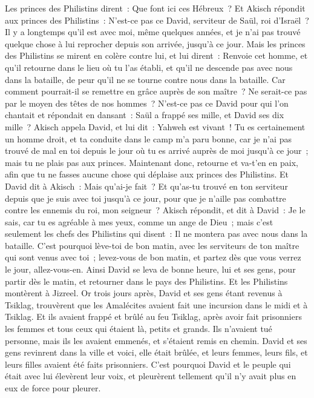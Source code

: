 \begin{multicols}{2}
Les princes des Philistins dirent~: Que font ici ces Hébreux~? Et Akisch répondit aux princes des Philistins~: N'est-ce pas ce David, serviteur de Saül, roi d'Israël~? Il y a longtemps qu'il est avec moi, même quelques années, et je n'ai pas trouvé quelque chose à lui reprocher depuis son arrivée, jusqu'à ce jour.
Mais les princes des Philistins se mirent en colère contre lui, et lui dirent~: Renvoie cet homme, et qu'il retourne dans le lieu où tu l'as établi, et qu'il ne descende pas avec nous dans la bataille, de peur qu'il ne se tourne contre nous dans la bataille. Car comment pourrait-il se remettre en grâce auprès de son maître~? Ne serait-ce pas par le moyen des têtes de nos hommes~?
N'est-ce pas ce David pour qui l'on chantait et répondait en dansant~: Saül a frappé ses mille, et David ses dix mille~?
Akisch appela David, et lui dit~: Yahweh est vivant~! Tu es certainement un homme droit, et ta conduite dans le camp m'a paru bonne, car je n'ai pas trouvé de mal en toi depuis le jour où tu es arrivé auprès de moi jusqu'à ce jour~; mais tu ne plais pas aux princes.
Maintenant donc, retourne et va-t'en en paix, afin que tu ne fasses aucune chose qui déplaise aux princes des Philistins.
Et David dit à Akisch~: Mais qu'ai-je fait~? Et qu'as-tu trouvé en ton serviteur depuis que je suis avec toi jusqu'à ce jour, pour que je n'aille pas combattre contre les ennemis du roi, mon seigneur~?
Akisch répondit, et dit à David~: Je le sais, car tu es agréable à mes yeux, comme un ange de Dieu~; mais c'est seulement les chefs des Philistins qui disent~: Il ne montera pas avec nous dans la bataille.
C'est pourquoi lève-toi de bon matin, avec les serviteurs de ton maître qui sont venus avec toi~; levez-vous de bon matin, et partez dès que vous verrez le jour, allez-vous-en.
Ainsi David se leva de bonne heure, lui et ses gens, pour partir dès le matin, et retourner dans le pays des Philistins. Et les Philistins montèrent à Jizreel.
\VerseOne{}Or trois jours après, David et ses gens étant revenus à Tsiklag, trouvèrent que les Amalécites avaient fait une incursion dans le midi et à Tsiklag. Et ils avaient frappé et brûlé au feu Tsiklag,
après avoir fait prisonniers les femmes et tous ceux qui étaient là, petits et grands. Ils n'avaient tué personne, mais ils les avaient emmenés, et s'étaient remis en chemin.
David et ses gens revinrent dans la ville et voici, elle était brûlée, et leurs femmes, leurs fils, et leurs filles avaient été faits prisonniers.
C'est pourquoi David et le peuple qui était avec lui élevèrent leur voix, et pleurèrent tellement qu'il n'y avait plus en eux de force pour pleurer.

\end{multicols}
